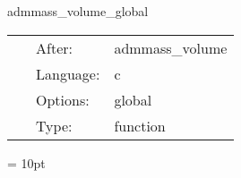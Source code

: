 \vspace{5mm}


\hspace{5mm} admmass\_volume\_global 

\hspace{5mm}{\it calculate the admmass using a volume integral: global routine } 


\hspace{5mm}

 \begin{tabular*}{160mm}{cll} 
~ & After:  & admmass\_volume \\ 
~ & Language:  & c \\ 
~ & Options:  & global \\ 
~ & Type:  & function \\ 
\end{tabular*} 



\vspace{5mm}\parskip = 10pt 

